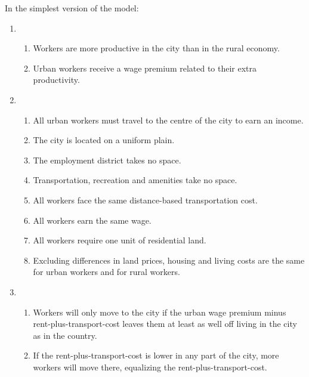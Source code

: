 In the simplest version of the model:
\begin{enumerate}
    \item 
    \begin{enumerate}\item \label{label-productivity}Workers are more productive in the city than in the rural economy.
    \item \label{label-wagepremium}Urban  workers receive a wage premium related to their extra productivity.
    \end{enumerate}
    \item \begin{enumerate}\item\label{label-workatcentre}All urban workers must travel to the centre of the city to earn an income.
    \item \label{label-uniformplain}The city is located on a uniform plain. 
    \item \label{label-emplymentspace}The employment district takes no space. 
    \item \label{label-transportspace}Transportation, recreation and amenities take no space. 
    \item \label{label-equaltransportcost}All workers face the same distance-based transportation cost. 
    \item \label{label-equalwage}All workers earn the same wage. 
    \item \label{label-equalland}All workers require one unit of residential land.
    \item \label{label-equalCOL}Excluding differences in land prices, housing and living costs are the same for urban workers and for rural workers. 
    \end{enumerate}
    \item \begin{enumerate}\item\label{label-externalequilibrium}Workers will only move to the city if the \gls{urban wage premium} minus rent-plus-transport-cost leaves them at least as well off living in the city as in the country. 
    \item \label{label-internalequilibrium}If the rent-plus-transport-cost is lower in any part of the city, more workers will move there, equalizing the rent-plus-transport-cost.
    \end{enumerate}
\end{enumerate}



